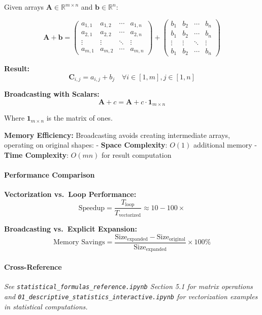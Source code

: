 \documentclass[11pt]{article}
\begin{document}
Given arrays \(\mathbf{A} \in \mathbb{R}^{m \times n}\) and
\(\mathbf{b} \in \mathbb{R}^n\):

\[\mathbf{A} + \mathbf{b} = \begin{pmatrix} 
a_{1,1} & a_{1,2} & \cdots & a_{1,n} \\
a_{2,1} & a_{2,2} & \cdots & a_{2,n} \\
\vdots & \vdots & \ddots & \vdots \\
a_{m,1} & a_{m,2} & \cdots & a_{m,n}
\end{pmatrix} + \begin{pmatrix} b_1 & b_2 & \cdots & b_n \\ b_1 & b_2 & \cdots & b_n \\ \vdots & \vdots & \ddots & \vdots \\ b_1 & b_2 & \cdots & b_n \end{pmatrix}\]

\textbf{Result:}
\[\mathbf{C}_{i,j} = a_{i,j} + b_j \quad \forall i \in [1,m], j \in [1,n]\]

\textbf{Broadcasting with Scalars:}
\[\mathbf{A} + c = \mathbf{A} + c \cdot \mathbf{1}_{m \times n}\]

Where \(\mathbf{1}_{m \times n}\) is the matrix of ones.

\textbf{Memory Efficiency:} Broadcasting avoids creating intermediate
arrays, operating on original shapes: - \textbf{Space Complexity}:
\(O(1)\) additional memory - \textbf{Time Complexity}: \(O(mn)\) for
result computation

\paragraph{Performance Comparison}\label{performance-comparison}

\textbf{Vectorization vs.~Loop Performance:}
\[\text{Speedup} = \frac{T_{\text{loop}}}{T_{\text{vectorized}}} \approx 10-100\times\]

\textbf{Broadcasting vs.~Explicit Expansion:}
\[\text{Memory Savings} = \frac{\text{Size}_{\text{expanded}} - \text{Size}_{\text{original}}}{\text{Size}_{\text{expanded}}} \times 100\%\]

\paragraph{Cross-Reference}\label{cross-reference}

\emph{See \texttt{statistical\_formulas\_reference.ipynb} Section 5.1
for matrix operations and
\texttt{01\_descriptive\_statistics\_interactive.ipynb} for
vectorization examples in statistical computations.}
\end{document}
